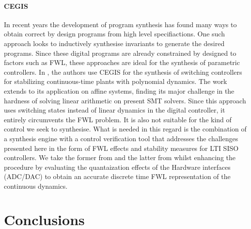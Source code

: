 \documentclass{sig-alternate-05-2015}
\begin{document}
\paragraph{CEGIS}

In recent years the development of program synthesis has found many ways to obtain correct by design programs from high level specifiactions. One such approach \cite{itzhaky2010simple} looks to inductively synthesise invariants to generate the desired programs. Since these digital programs are already constrained by designed to factors such as FWL, these approaches are ideal for the synthesis of parametric controllers.
In \cite{DBLP:conf/cdc/RavanbakhshS15}, the authors use CEGIS for the synthesis of switching controllers for stabilizing continuous-time plants with polynomial dynamics. The work extends to its application on affine systems, finding its major challenge in the hardness of solving linear arithmetic on present SMT solvers. Since this approach uses switching states instead of linear dynamics in the digital controller, it entirely circumvents the FWL problem. It is also not suitable for the kind of control we seek to synthesise.
What is needed in this regard is the combination of a synthesis engine with a control verification tool that addresses the challenges presented here in the form of FWL effects and stability measures for LTI SISO controllers. We take the former from \cite{} and the latter from \cite{daes20161} whilst enhancing the procedure by evaluating the quantaization effects of the Hardware interfaces (ADC/DAC) to obtain an accurate discrete time FWL representation of the continuous dynamics.
 

\section{Conclusions}


  

\end{document}
